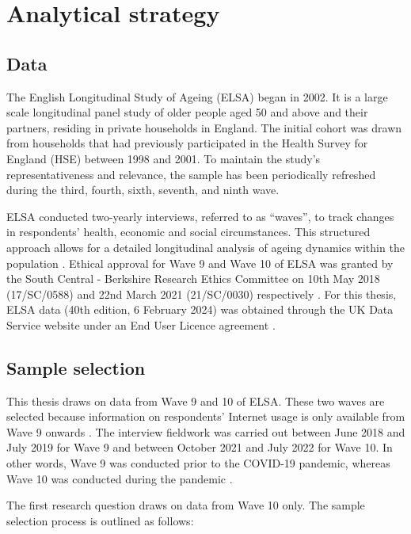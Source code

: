 \chapter{\label{ch:4-strategy}Analytical strategy}

\section{Data}
The English Longitudinal Study of Ageing (ELSA) began in 2002. It is a large scale longitudinal panel study of older people aged 50 and above and their partners, residing in private households in England. The initial cohort was drawn from households that had previously participated in the Health Survey for England (HSE) between 1998 and 2001. To maintain the study's representativeness and relevance, the sample has been periodically refreshed during the third, fourth, sixth, seventh, and ninth wave. 

ELSA conducted two-yearly interviews, referred to as ``waves”, to track changes in respondents' health, economic and social circumstances. This structured approach allows for a detailed longitudinal analysis of ageing dynamics within the population \parencite{natcensocialresearch_user_2020}. Ethical approval for Wave 9 and Wave 10 of ELSA was granted by the South Central - Berkshire Research Ethics Committee on 10th May 2018 (17/SC/0588) and 22nd March 2021 (21/SC/0030) respectively \parencite{elsaproject_ethical_2024}. For this thesis, ELSA data (40th edition, 6 February 2024) was obtained through the UK Data Service website under an End User Licence agreement \parencite{banks_english_2024}. 

\section{Sample selection}
This thesis draws on data from Wave 9 and 10 of ELSA. These two waves are selected because information on respondents' Internet usage is only available from Wave 9 onwards \parencite{vidiasratri_association_2022}. The interview fieldwork was carried out between June 2018 and July 2019 for Wave 9 and between October 2021 and July 2022 for Wave 10. In other words, Wave 9 was conducted prior to the COVID-19 pandemic, whereas Wave 10 was conducted during the pandemic \parencite{natcensocialresearch_interviewer_2022,natcensocialresearch_user_2020}. 

The first research question draws on data from Wave 10 only. The sample selection process is outlined as follows:

